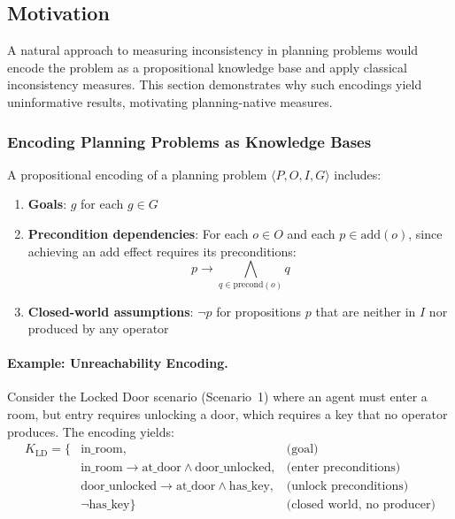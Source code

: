 \subsection{Motivation}
\label{sec:naive_encoding}

A natural approach to measuring inconsistency in planning problems would encode the problem as a propositional knowledge base and apply classical inconsistency measures. This section demonstrates why such encodings yield uninformative results, motivating planning-native measures.

\subsubsection{Encoding Planning Problems as Knowledge Bases}

A propositional encoding of a planning problem $\langle P, O, I, G \rangle$ includes:
\begin{enumerate}
    \item \textbf{Goals}: $g$ for each $g \in G$
    \item \textbf{Precondition dependencies}: For each $o \in O$ and each $p \in \text{add}(o)$, since achieving an add effect requires its preconditions:
          \begin{equation*}
              p \rightarrow \bigwedge_{q \in \text{precond}(o)} q
          \end{equation*}
    \item \textbf{Closed-world assumptions}: $\neg p$ for propositions $p$ that are neither in $I$ nor produced by any operator
\end{enumerate}

\paragraph{Example: Unreachability Encoding.}

Consider the Locked Door scenario (Scenario~1) where an agent must enter a room, but entry requires unlocking a door, which requires a key that no operator produces. The encoding yields:
\begin{align*}
    K_{\text{LD}} = \{ & \text{in\_room},                                                         & \text{(goal)}                      \\
                       & \text{in\_room} \rightarrow \text{at\_door} \land \text{door\_unlocked}, & \text{(enter preconditions)}       \\
                       & \text{door\_unlocked} \rightarrow \text{at\_door} \land \text{has\_key}, & \text{(unlock preconditions)}      \\
                       & \neg \text{has\_key} \}                                                  & \text{(closed world, no producer)}
\end{align*}

